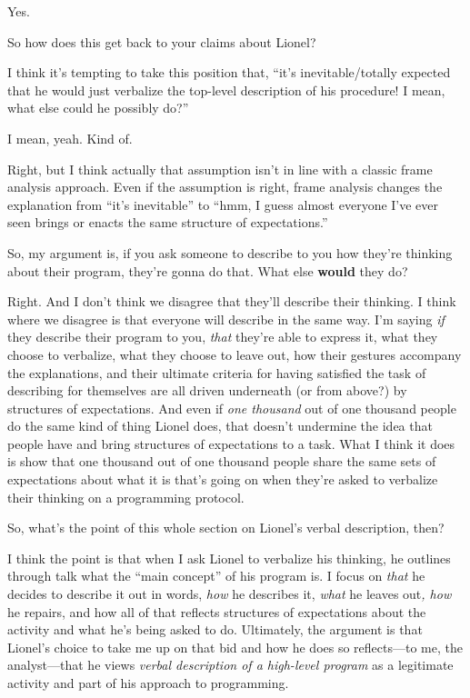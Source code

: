 Yes.

So how does this get back to your claims about Lionel?

I think it's tempting to take this position that, ``it's
inevitable/totally expected that he would just verbalize the top-level
description of his procedure! I mean, what else could he possibly do?''

I mean, yeah. Kind of.

Right, but I think actually that assumption isn't in line with a classic
frame analysis approach. Even if the assumption is right, frame analysis
changes the explanation from ``it's inevitable'' to ``hmm, I guess
almost everyone I've ever seen brings or enacts the same structure of
expectations.''

So, my argument is, if you ask someone to describe to you how they're
thinking about their program, they're gonna do that. What else
\textbf{would} they do?

Right. And I don't think we disagree that they'll describe their
thinking. I think where we disagree is that everyone will describe in
the same way. I'm saying \emph{if} they describe their program to you,
\emph{that} they're able to express it, what they choose to verbalize,
what they choose to leave out, how their gestures accompany the
explanations, and their ultimate criteria for having satisfied the task
of describing for themselves are all driven underneath (or from above?)
by structures of expectations. And even if \emph{one thousand} out of
one thousand people do the same kind of thing Lionel does, that doesn't
undermine the idea that people have and bring structures of expectations
to a task. What I think it does is show that one thousand out of one
thousand people share the same sets of expectations about what it is
that's going on when they're asked to verbalize their thinking on a
programming protocol.

So, what's the point of this whole section on Lionel's verbal
description, then?

I think the point is that when I ask Lionel to verbalize his thinking,
he outlines through talk what the ``main concept'' of his program is. I
focus on \emph{that} he decides to describe it out in words, \emph{how}
he describes it, \emph{what} he leaves out\emph{, how} he repairs, and
how all of that reflects structures of expectations about the activity
and what he's being asked to do. Ultimately, the argument is that
Lionel's choice to take me up on that bid and how he does so
reflects---to me, the analyst---that he views \emph{verbal description
of a high-level program} as a legitimate activity and part of his
approach to programming.

